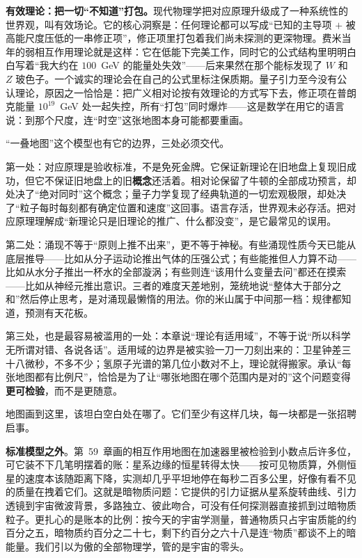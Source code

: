 \begin{challenge}
\textbf{有效理论：把一切“不知道”打包。}现代物理学把对应原理升级成了一种系统性的世界观，叫有效场论。它的核心洞察是：任何理论都可以写成“已知的主导项 $+$ 被高能尺度压低的一串修正项”，修正项里打包着我们尚未探测的更深物理。费米当年的弱相互作用理论就是这样：它在低能下完美工作，同时它的公式结构里明明白白写着“我大约在 $100$~GeV 的能量处失效”——后来果然在那个能标发现了 $W$ 和 $Z$ 玻色子。一个诚实的理论会在自己的公式里标注保质期。量子引力至今没有公认理论，原因之一恰恰是：把广义相对论按有效理论的方式写下去，修正项在普朗克能量 $10^{19}$~GeV 处一起失控，所有“打包”同时爆炸——这是数学在用它的语言说：到那个尺度，连“时空”这张地图本身可能都要重画。
\end{challenge}


“一叠地图”这个模型也有它的边界，三处必须交代。

第一处：对应原理是验收标准，不是免死金牌。它保证新理论在旧地盘上复现旧成功，但它不保证旧地盘上的旧\textbf{概念}还活着。相对论保留了牛顿的全部成功预言，却处决了“绝对同时”这个概念；量子力学复现了经典轨道的一切宏观极限，却处决了“粒子每时每刻都有确定位置和速度”这回事。语言存活，世界观未必存活。把对应原理理解成“新理论只是旧理论的推广、什么都没变”，是它最常见的误用。

第二处：涌现不等于“原则上推不出来”，更不等于神秘。有些涌现性质今天已能从底层推导——比如从分子运动论推出气体的压强公式；有些能推但人力算不动——比如从水分子推出一杯水的全部漩涡；有些则连“该用什么变量去问”都还在摸索——比如从神经元推出意识。三者的难度天差地别，笼统地说“整体大于部分之和”然后停止思考，是对涌现最懒惰的用法。你的米山属于中间那一档：规律都知道，预测有天花板。

第三处，也是最容易被滥用的一处：本章说“理论有适用域”，不等于说“所以科学无所谓对错、各说各话”。适用域的边界是被实验一刀一刀刻出来的：卫星钟差三十八微秒，不多不少；氢原子光谱的第几位小数对不上，理论就得搬家。承认“每张地图都有比例尺”，恰恰是为了让“哪张地图在哪个范围内是对的”这个问题变得\textbf{更可检验}，而不是更随意。

地图画到这里，该坦白空白处在哪了。它们至少有这样几块，每一块都是一张招聘启事。

\textbf{标准模型之外}。第~59~章画的相互作用地图在加速器里被检验到小数点后许多位，可它装不下几笔明摆着的账：星系边缘的恒星转得太快——按可见物质算，外侧恒星的速度本该随距离下降，实测却几乎平坦地停在每秒二百多公里，好像有看不见的质量在拽着它们。这就是暗物质问题：它提供的引力证据从星系旋转曲线、引力透镜到宇宙微波背景，多路独立、彼此吻合，可没有任何探测器直接抓到过暗物质粒子。更扎心的是账本的比例：按今天的宇宙学测量，普通物质只占宇宙质能的约百分之五，暗物质约百分之二十七，剩下约百分之六十八是连“物质”都谈不上的暗能量。我们引以为傲的全部物理学，管的是宇宙的零头。

